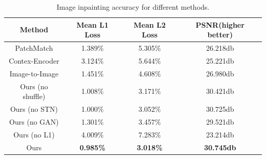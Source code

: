 \documentclass{IEEE_lsens}
\begin{document}
\begin{table}[!t]
  \caption{Image inpainting accuracy for different methods.}
  \centering
  \begin{tabular}{c|c|c|c}
    \hline
    \bf{Method}             &   \bf{Mean L1 Loss}     &   \bf{Mean L2 Loss}   &   \bf{PSNR}(higher better)   \\
    \hline
    \hline
    PatchMatch       	 &  1.389\%         &  5.305\%          &  26.218db              \\
    \hline
    Contex-Encoder       &  3.124\%         &  5.644\%          &  25.221db              \\
    \hline
    Image-to-Image       &  1.451\%         &  4.608\%          &  26.980db              \\
    \hline
    Ours (no shuffle)    &  1.008\%         &  3.171\%          &  30.421db              \\
    \hline
    Ours (no STN)        &  1.000\%         &  3.052\%          &  30.725db              \\
    \hline
    Ours (no GAN)        &  1.301\%         &  3.457\%          &  29.521db             \\
    \hline
    Ours (no L1)         &  4.009\%         &  7.283\%          &  23.214db             \\
    \hline
    Ours                 & \bf{0.985\%}     &  \bf{3.018\%}     &  \bf{30.745db}              \\
    \hline
  \end{tabular}
  \label{resultTable}
\end{table}

\end{document}
